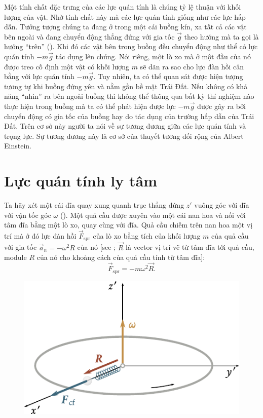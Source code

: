 Một tính chất đặc trưng của các lực quán tính là chúng tỷ lệ thuận với khối lượng của vật. Nhờ tính chất này mà các lực quán tính giống như các lực hấp dẫn. Tưởng tượng chúng ta đang ở trong một cái buồng kín, xa tất cả các vật bên ngoài và đang chuyển động thẳng đứng với gia tốc $\vec{g}$ theo hướng mà ta gọi là hướng ``trên'' (). Khi đó các vật bên trong buồng đều chuyển động như thể có lực quán tính $-m\vec{g}$ tác dụng lên chúng. Nói riêng, một lò xo mà ở một đầu của nó được treo cố định một vật có khối lượng $m$ sẽ dãn ra sao cho lực đàn hồi cân bằng với lực quán tính $-m\vec{g}$. Tuy nhiên, ta có thể quan sát được hiện tượng tương tự khi buồng đứng yên và nằm gần bề mặt Trái Đất. Nếu không có khả năng ``nhìn'' ra bên ngoài buồng thì không thể thông qua bất kỳ thí nghiệm nào thực hiện trong buồng mà ta có thể phát hiện được lực $-m\vec{g}$ được gây ra bởi chuyển động có gia tốc của buồng hay do tác dụng của trường hấp dẫn của Trái Đất. Trên cơ sở này người ta nói về sự tương đương giữa các lực quán tính và trọng lực. Sự tương đương này là cơ sở của thuyết tương đối rộng của Albert Einstein.

\section{Lực quán tính ly tâm}\label{sec:4_2}

Ta hãy xét một cái đĩa quay xung quanh trục thẳng đứng $z'$ vuông góc với đĩa với vận tốc góc $\omega$ (). Một quả cầu được xuyên vào một cái nan hoa và nối với tâm đĩa bằng một lò xo, quay cùng với đĩa. Quả cầu chiếm trên nan hoa một vị trí mà ở đó lực đàn hồi $\vec{F}_{\text{spr}}$ của lò xo bằng tích của khối lượng $m$ của quả cầu với gia tốc $\vec{a}_n = -\omega^2R$ của nó [see ; $\vec{R}$ là vector vị trí vẽ từ tâm đĩa tới quả cầu, module $R$ của nó cho khoảng cách của quả cầu tính từ tâm đĩa]:
\begin{equation}\label{eq:4_4}
\vec{F}_{\text{spr}} = -m\omega^2\vec{R}.
\end{equation}

\begin{figure}[!htb]
	\begin{center}
		\includegraphics[scale=0.95]{figures/ch_04/fig_4_3.pdf}
		\caption[]{}
		\label{fig:4_3}
	\end{center}
\end{figure}

